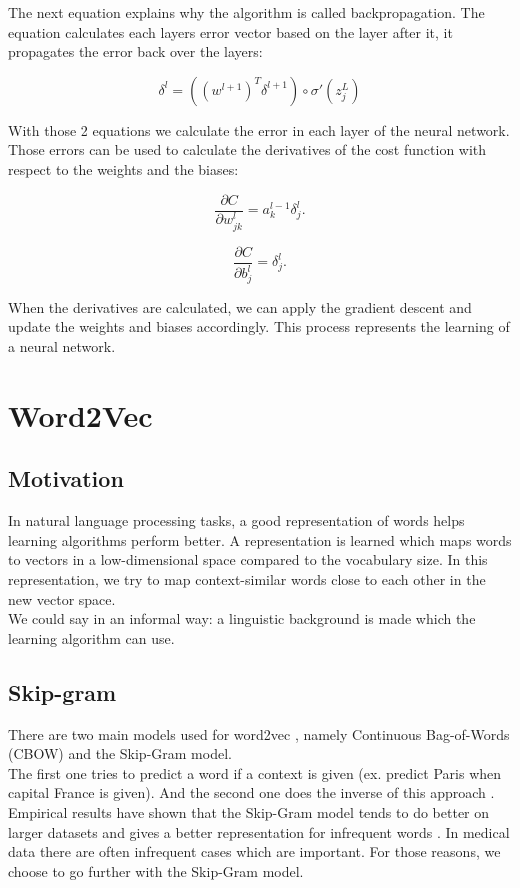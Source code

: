The next equation explains why the algorithm is called backpropagation. The equation calculates each layers error vector based on the layer after it, it propagates the error back over the layers:

\begin{equation} 
\delta^l = ((w^{l+1})^T\delta^{l+1}) \circ \sigma'(z_j^L)
\end{equation}

With those 2 equations we calculate the error in each layer of the neural network. Those errors can be used to calculate the derivatives of the cost function with respect to the weights and the biases:

\begin{equation} 
\frac{\partial C}{\partial w^l_{jk}} = a^{l-1}_k \delta^l_j.
\end{equation}

\begin{equation} 
\frac{\partial C}{\partial b^l_j} = \delta^l_j.
\end{equation}

When the derivatives are calculated, we can apply the gradient descent and update the weights and biases accordingly. This process represents the learning of a neural network.


\section{Word2Vec}
\label{sec:word2vec}

\subsection{Motivation}

In natural language processing tasks, a good representation of words helps learning algorithms perform better. A representation is learned which maps words to vectors in a low-dimensional space compared to the vocabulary size. In this representation, we try to map context-similar words close to each other in the new vector space. \\
We could say in an informal way: a linguistic background is made which the learning algorithm can use.


\subsection{Skip-gram}

There are two main models used for word2vec \cite{w2vOriginal:article}, namely Continuous Bag-of-Words (CBOW) and the Skip-Gram model. \\
The first one tries to predict a word if a context is given (ex. predict Paris when capital France is given). And the second one does the inverse of this approach \cite{w2vModels:article}. Empirical results have shown that the Skip-Gram model tends to do better on larger datasets \cite{w2vReason1:online} and gives a better representation for infrequent words \cite{w2vArchive:online}. In medical data there are often infrequent cases which are important. For those reasons, we choose to go further with the Skip-Gram model. \\

